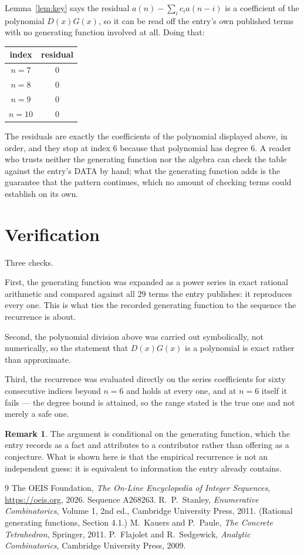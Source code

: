 \documentclass[11pt,a4paper]{article}
\theoremstyle{plain}
\theoremstyle{definition}
\newtheorem{remark}[theorem]{Remark}
\begin{document}
Lemma~\ref{lem:key} says the residual $a(n)-\sum_ic_ia(n-i)$ is a coefficient of the
polynomial $D(x)G(x)$, so it can be read off the entry's own published terms with no
generating function involved at all. Doing that:
\begin{center}
\begin{tabular}{cc}
index & residual \\ \hline
$n=7$ & $0$ \\
$n=8$ & $0$ \\
$n=9$ & $0$ \\
$n=10$ & $0$
\end{tabular}
\end{center}
The residuals are exactly the coefficients of the polynomial displayed above, in order, and
they stop at index $6$ because that polynomial has degree $6$. A reader who trusts
neither the generating function nor the algebra can check the table against the entry's DATA
by hand; what the generating function adds is the guarantee that the pattern continues, which
no amount of checking terms could establish on its own.

\section{Verification}

Three checks.

First, the generating function was expanded as a power series in exact rational arithmetic and
compared against all $29$ terms the entry publishes: it reproduces every one. This is
what ties the recorded generating function to the sequence the recurrence is about.

Second, the polynomial division above was carried out symbolically, not numerically, so the
statement that $D(x)G(x)$ is a polynomial is exact rather than approximate.

Third, the recurrence was evaluated directly on the series coefficients for sixty consecutive
indices beyond $n=6$ and holds at every one, and at $n=6$ itself it fails --- the
degree bound is attained, so the range stated is the true one and not merely a safe one.

\begin{remark}
The argument is conditional on the generating function, which the entry records as a fact and
attributes to a contributor rather than offering as a conjecture. What is shown here is that
the empirical recurrence is not an independent guess: it is equivalent to information the
entry already contains.
\end{remark}

\begin{thebibliography}{9}
 The OEIS Foundation, \emph{The On-Line Encyclopedia of Integer
Sequences}, \url{https://oeis.org}, 2026. Sequence A268263.
 R.~P.~Stanley, \emph{Enumerative Combinatorics}, Volume 1, 2nd ed.,
Cambridge University Press, 2011. (Rational generating functions, Section 4.1.)
 M.~Kauers and P.~Paule, \emph{The Concrete Tetrahedron}, Springer, 2011.
 P.~Flajolet and R.~Sedgewick, \emph{Analytic Combinatorics}, Cambridge
University Press, 2009.
\end{thebibliography}
\end{document}
